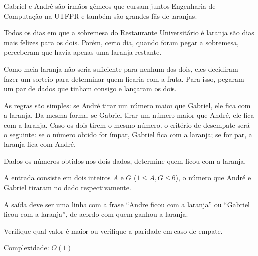 Gabriel e André são irmãos gêmeos que cursam juntos Engenharia de Computação na UTFPR e também são grandes fãs de laranjas.

Todos os dias em que a sobremesa do Restaurante Universitário é laranja são dias mais felizes para os dois. Porém, certo dia, quando foram pegar a sobremesa, perceberam que havia apenas uma laranja restante.

Como meia laranja não seria suficiente para nenhum dos dois, eles decidiram fazer um sorteio para determinar quem ficaria com a fruta. Para isso, pegaram um par de dados que tinham consigo e lançaram os dois.

As regras são simples: se André tirar um número maior que Gabriel, ele fica com a laranja. Da mesma forma, se Gabriel tirar um número maior que André, ele fica com a laranja. Caso os dois tirem o mesmo número, o critério de desempate será o seguinte: se o número obtido for ímpar, Gabriel fica com a laranja; se for par, a laranja fica com André.

Dados os números obtidos nos dois dados, determine quem ficou com a laranja.


A entrada consiste em dois inteiros $A$ e $G$ ($1 \leq A, G \leq 6$), o número que André e Gabriel tiraram no dado respectivamente.

A saída deve ser uma linha com a frase ``Andre ficou com a laranja'' ou ``Gabriel ficou com a laranja'', de acordo com quem ganhou a laranja.

Verifique qual valor é maior ou verifique a paridade em caso de empate.

Complexidade: $O(1)$
